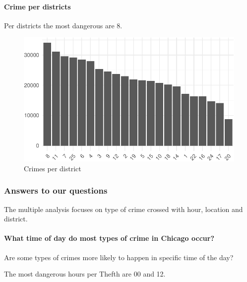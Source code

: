 \documentclass[]{article}
\let\oldparagraph\paragraph
\renewcommand{\paragraph}[1]{\oldparagraph{#1}\mbox{}}
\begin{document}
\paragraph{Crime per districts}\label{crime-per-districts}

Per districts the most dangerous are 8.

\begin{figure}[H]

{\centering \includegraphics{Assessment_1v8_files/figure-latex/fig8-1} 

}

\caption{Crimes per district}\label{fig:fig8}
\end{figure}

\subsubsection{Answers to our questions}\label{answers-to-our-questions}

The multiple analysis focuses on type of crime crossed with hour,
location and district.

\paragraph{What time of day do most types of crime in Chicago
occur?}\label{what-time-of-day-do-most-types-of-crime-in-chicago-occur}

Are some types of crimes more likely to happen in specific time of the
day?

The most dangerous hours per Thefth are 00 and 12.
\end{document}
